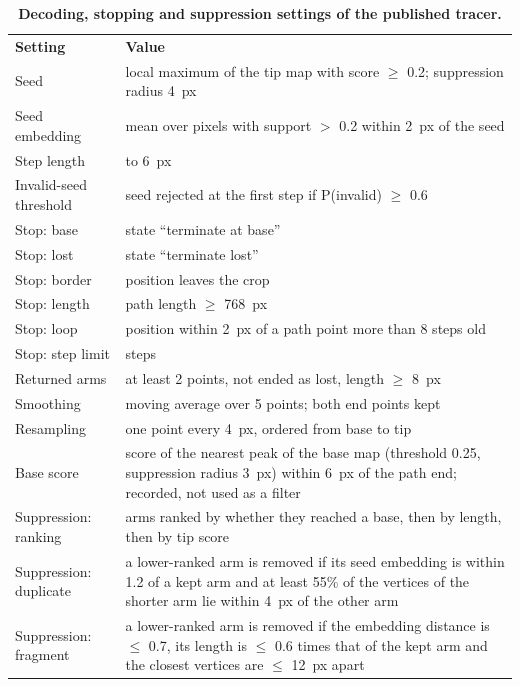 \begin{table}[!htbp]
\centering
\caption{\textbf{Decoding, stopping and suppression settings of the published tracer.}}
\label{tab:decoding}
{\small
\begin{tabular}{|>{\raggedright\arraybackslash}p{1.9in}|>{\raggedright\arraybackslash}p{4.1in}|}
\hline
\textbf{Setting} & \textbf{Value} \\ \thickhline
Seed & local maximum of the tip map with score $\geq$ 0.2; suppression radius 4~px \\ \hline
Seed embedding & mean over pixels with support $>$ 0.2 within 2~px of the seed \\ \hline
Step length & 0.5 to 6~px \\ \hline
Invalid-seed threshold & seed rejected at the first step if P(invalid) $\geq$ 0.6 \\ \hline
Stop: base & state ``terminate at base'' \\ \hline
Stop: lost & state ``terminate lost'' \\ \hline
Stop: border & position leaves the crop \\ \hline
Stop: length & path length $\geq$ 768~px \\ \hline
Stop: loop & position within 2~px of a path point more than 8 steps old \\ \hline
Stop: step limit & 128 steps \\ \hline
Returned arms & at least 2 points, not ended as lost, length $\geq$ 8~px \\ \hline
Smoothing & moving average over 5 points; both end points kept \\ \hline
Resampling & one point every 4~px, ordered from base to tip \\ \hline
Base score & score of the nearest peak of the base map (threshold 0.25, suppression radius 3~px) within 6~px of the path end; recorded, not used as a filter \\ \hline
Suppression: ranking & arms ranked by whether they reached a base, then by length, then by tip score \\ \hline
Suppression: duplicate & a lower-ranked arm is removed if its seed embedding is within 1.2 of a kept arm and at least 55\% of the vertices of the shorter arm lie within 4~px of the other arm \\ \hline
Suppression: fragment & a lower-ranked arm is removed if the embedding distance is $\leq$ 0.7, its length is $\leq$ 0.6 times that of the kept arm and the closest vertices are $\leq$ 12~px apart \\ \hline
\end{tabular}
}
\end{table}

